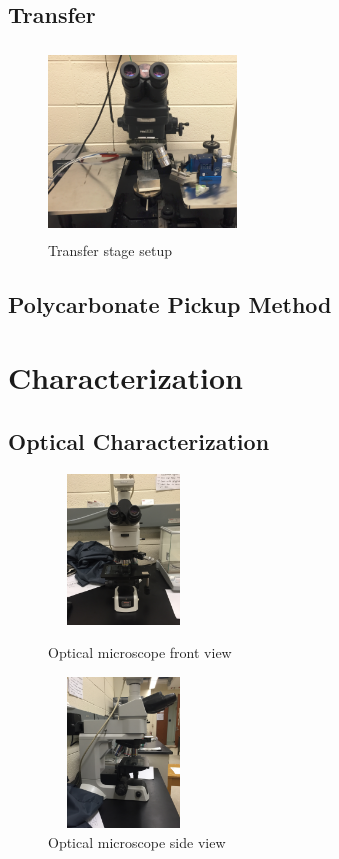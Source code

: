 \subsection{Transfer}\label{subsec:transfer}
\begin{figure}[ht]
	\centering
	\includegraphics[height=5cm,width=5cm]{figs/experimental/transfer_stage_setup}
	\caption[Transfer stage setup]{Transfer stage setup}
	\label{fig:transfer_stage_setup}
\end{figure}
\subsection{Polycarbonate Pickup Method}\label{subsec:pc_pickup}

\section{Characterization}\label{sec:characterization}
\subsection{Optical Characterization}\label{subsec:characterization_optical}
\begin{figure}[ht]
	\centering
	\begin{minipage}[b]{0.45\linewidth}
		\includegraphics[height=4cm,width=4cm]{figs/experimental/optical_microscope_front_view}
		\caption[Optical microscope front view]{Optical microscope front view}
		\label{fig:optical_microscope_front_view}
	\end{minipage}
	\qquad
	\begin{minipage}[b]{0.45\linewidth}
		\includegraphics[height=4cm,width=4cm]{figs/experimental/optical_microscope_side_view}
		\caption[Optical microscope side view]{Optical microscope side view}
		\label{fig:optical_microscope_side_view}
	\end{minipage}
\end{figure}

